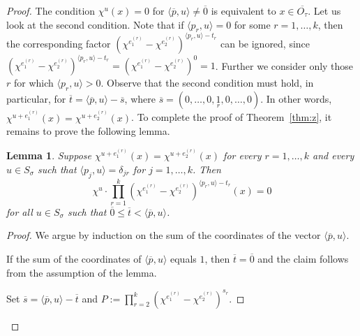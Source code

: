 \documentclass[a4paper, 11pt]{amsart}
\theoremstyle{plain}
\newtheorem{lemma}[theorem]{Lemma}
\theoremstyle{remark}
\theoremstyle{definition}
\newcommand{\ol}[1]{\overline{#1}}
\begin{document}
\begin{proof}
The condition $\chi^u(x) = 0$ for $\langle \ol{p}, u \rangle \neq \ol{0}$ is equivalent to $x \in \overline{O_\tau}$. Let us look at the second condition. Note that if $\langle p_r , u\rangle = 0$ for some $r = 1, \ldots, k$, then the corresponding factor $\left( \chi^{e_1^{(r)}} - \chi^{e_2^{(r)}}\right)^{\langle p_r, u\rangle - t_r}$ can be ignored, since $\left( \chi^{e_1^{(r)}} - \chi^{e_2^{(r)}}\right)^{\langle p_r, u\rangle - t_r} = \left( \chi^{e_1^{(r)}} - \chi^{e_2^{(r)}}\right)^0 = 1$. Further we consider only those $r$ for which $\langle p_r , u\rangle > 0$. Observe that the second condition must hold, in particular, for $\ol{t} = \langle \ol{p} , u\rangle - \ol{s}$, where $\ol{s} = (0, \ldots, 0, \underset{r}{1}, 0, \ldots, 0)$. In other words, $\chi^{u + e_1^{(r)}}(x) =  \chi^{u + e_2^{(r)}}(x)$.  To complete the proof of Theorem~\ref{thm:z}, it remains to prove the following lemma.

\begin{lemma}
Suppose $\chi^{u + e_1^{(r)}}(x) =  \chi^{u + e_2^{(r)}}(x)$ for every $r=1, \ldots, k$ and every $u \in S_\sigma$ such that $\langle p_j, u \rangle = \delta_{jr}$ for $j = 1, \ldots, k$. Then \[\chi^u \cdot \prod\limits_{r = 1}^{k}\left( \chi^{e_1^{(r)}} - \chi^{e_2^{(r)}}\right)^{\langle p_r , u\rangle - t_r} (x) = 0\] for all $u \in S_\sigma$ such that $\ol{0} \le \ol{t} < \langle \ol{p}, u \rangle$.
\end{lemma}

\begin{proof}
We argue by induction on the sum of the coordinates of the vector $\langle \ol{p}, u \rangle$.  

If the sum of the coordinates of $\langle \ol{p}, u \rangle$ equals $1$, then $\ol{t}=\ol{0}$ and the claim follows from the assumption of the lemma.  

Set $\ol{s} = \langle \ol{p} , u\rangle - \ol{t}$ and $P:= \prod\limits_{r = 2}^{k}\left( \chi^{e_1^{(r)}} - \chi^{e_2^{(r)}}\right)^{s_r} $. 


\end{proof}
\end{proof}
\end{document}
